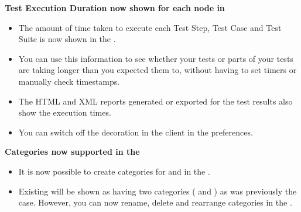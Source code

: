 \textbf{Test Execution Duration now shown for each node in \gdtestresultview{}}\\
\begin{itemize}
\item The amount of time taken to execute each Test Step, Test Case and Test Suite is now shown in the \gdtestresultview{}.
\item You can use this information to see whether your tests or parts of your tests are taking longer than you expected them to, 
without having to set timers or manually check timestamps.
\item The HTML and XML reports generated or exported for the test results also show the execution times.
\item You can switch off the decoration in the \app{} client in the  preferences.
\end{itemize} 

\textbf{Categories now supported in the \gdtestsuitebrowser{}}\\
\begin{itemize}
\item It is now possible to create categories for \gdsuites{} and \gdjobs{} in the \gdtestsuitebrowser{}. 
\item Existing \gdprojects{} will be shown as having two categories ( and ) as was previously the case. However, you can now rename, delete and rearrange categories in the \gdtestsuitebrowser{}. 
\end{itemize} 


